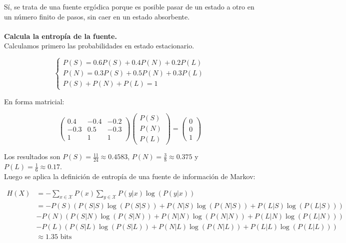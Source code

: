 \documentclass{article}
\begin{document}
Sí, se trata de una fuente ergódica porque es posible pasar de un estado a otro en un número finito de pasos, sin caer en un estado absorbente.\\

~\\
\textbf{Calcula la entropía de la fuente.}\\

Calculamos primero las probabilidades en estado estacionario.

$$
\begin{cases}
P(S) = 0.6P(S) + 0.4P(N) + 0.2P(L)\\
P(N) = 0.3P(S) + 0.5P(N) + 0.3P(L)\\
P(S) + P(N) + P(L) = 1
\end{cases}
$$

En forma matricial:

$$
\begin{pmatrix}
0.4 & -0.4 & -0.2\\
-0.3 & 0.5 & -0.3\\
1 & 1 & 1
\end{pmatrix}
\begin{pmatrix}
P(S)\\
P(N)\\
P(L)
\end{pmatrix}
=
\begin{pmatrix}
0\\
0\\
1
\end{pmatrix}
$$

Los resultados son $P(S)=\frac{11}{24}\approx 0.4583$, $P(N)=\frac{3}{8}\approx 0.375$ y $P(L)=\frac{1}{6}\approx 0.17$.\\

Luego se aplica la definición de entropía de una fuente de información de Markov:

\begin{align*}
H(X) &= -\sum_{x\in\mathcal{X}}P(x)\sum_{y\in\mathcal{X}}P(y|x)\log\left(P(y|x)\right)\\
&= -P(S)\left(P(S|S)\log\left(P(S|S)\right)+P(N|S)\log\left(P(N|S)\right)+P(L|S)\log\left(P(L|S)\right)\right)\\
&-P(N)\left(P(S|N)\log\left(P(S|N)\right)+P(N|N)\log\left(P(N|N)\right)+P(L|N)\log\left(P(L|N)\right)\right)\\
&-P(L)\left(P(S|L)\log\left(P(S|L)\right)+P(N|L)\log\left(P(N|L)\right)+P(L|L)\log\left(P(L|L)\right)\right)\\
&\approx 1.35\text{ bits}
\end{align*}
\end{document}
